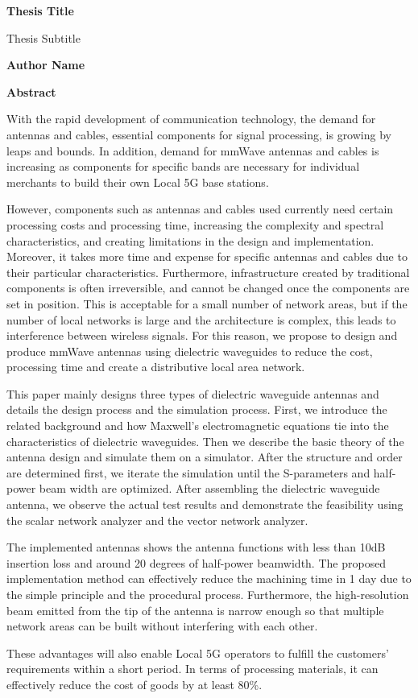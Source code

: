 \documentclass[a4paper,12pt]{report}
\begin{document}
\thispagestyle{plain}
\begin{center}
    \Large
    \textbf{Thesis Title}
        
    \vspace{0.4cm}
    \large
    Thesis Subtitle
        
    \vspace{0.4cm}
    \textbf{Author Name}
       
    \vspace{0.9cm}
    \textbf{Abstract}
\end{center}

With the rapid development of communication technology, the demand
for antennas and cables, essential components for signal processing,
is growing by leaps and
bounds.
In addition,
demand for mmWave antennas and cables is increasing as
components for specific bands are necessary for individual
merchants to build their own Local 5G base stations.

However, components such as antennas and cables used
currently need certain
processing costs and processing time,
increasing the complexity and spectral characteristics,
and creating limitations in the design and implementation.
Moreover, it takes
more time and expense for specific antennas and cables
due to their particular
characteristics.
Furthermore, infrastructure created by traditional components
is often irreversible, and cannot be changed once
the components are set in position.
This is acceptable for a small number of network areas, but if the number
of local networks is large and the architecture is complex,
this leads to interference between wireless signals.
For this reason, we propose to design and produce
mmWave antennas using dielectric waveguides to reduce the cost,
processing time
and create a distributive local area network.

This paper mainly designs three types of dielectric waveguide antennas
and details the design process and the simulation process.
First, we introduce the related background
and how Maxwell's electromagnetic equations tie into the characteristics
of dielectric waveguides.
Then we describe the basic theory of the antenna design
and simulate them on a simulator.
After the structure and order are determined first,
we iterate the simulation until
the S-parameters and half-power beam width are optimized.
After
assembling the dielectric waveguide antenna,
we observe the actual
test results and demonstrate the feasibility
using the scalar network analyzer and the vector network analyzer.

The implemented antennas shows the antenna functions with less than 10dB
insertion loss and around 20 degrees of half-power beamwidth.
The proposed implementation
method can effectively reduce the machining time in 1 day
due to the simple principle and the procedural process.
Furthermore, the high-resolution beam
emitted from the tip of the antenna is narrow enough so
that multiple network areas can be built without interfering with each other.

These advantages will also enable Local 5G operators
to fulfill the customers' requirements within a short period. In terms of
processing materials,
it can effectively reduce the cost of goods by at least
80\%.
\end{document}
